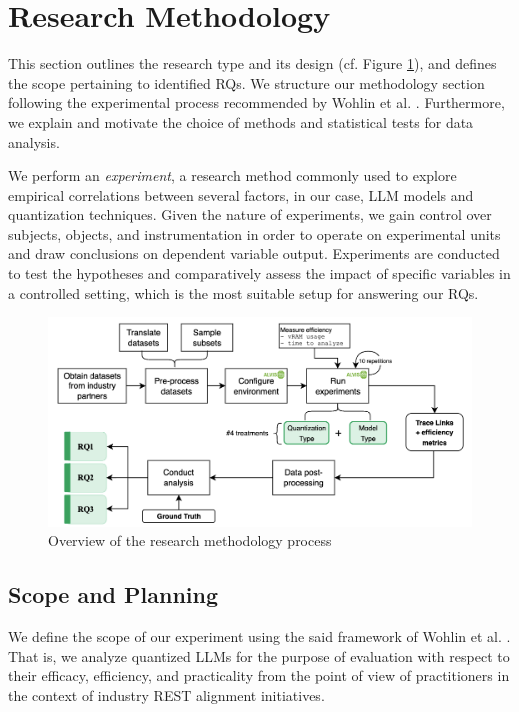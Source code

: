 
\section{Research Methodology}\label{sec:method}

This section outlines the research type and its design (cf. Figure \ref{fig:method-overview}), and defines the scope pertaining to identified RQs. We structure our methodology section following the experimental process recommended by Wohlin et al. \cite{wohlin2012experimentation}. Furthermore, we explain and motivate the choice of methods and statistical tests for data analysis. 

We perform an \textit{experiment}, a research method commonly used to explore empirical correlations between several factors, in our case, LLM models and quantization techniques. Given the nature of  experiments, we gain control over subjects, objects, and instrumentation in order to operate on experimental units and draw conclusions on dependent variable output. Experiments are conducted to test the hypotheses and comparatively assess the impact of specific variables in a controlled setting, which is the most suitable setup for answering our RQs.

\begin{figure}[h]
    \centering
    \includegraphics[width=\columnwidth]{images/method-overview-feedback}
    \caption{Overview of the research methodology process}
    \label{fig:method-overview}
\end{figure}

\subsection{Scope and Planning}
We define the scope of our experiment using the said framework of Wohlin et al. \cite{wohlin2012experimentation}. That is, we analyze quantized LLMs for the purpose of evaluation with respect to their efficacy, efficiency, and practicality from the point of view of practitioners in the context of industry REST alignment initiatives.

